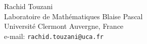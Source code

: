 \documentclass[a4paper]{book}
\newcommand{\+}{\discretionary{\mbox{\scriptsize$\hookleftarrow$}}{}{}}
\begin{document}
\vbox{}

\vskip 17cm
\noindent
Rachid Touzani\\
{Laboratoire de Math\'ematiques Blaise Pascal}\\
{Universit\'e Clermont Auvergne, France}\\
{e-mail: {\tt rachid.touzani@uca.fr}}

\newpage

\tableofcontents
{}

\end{document}
